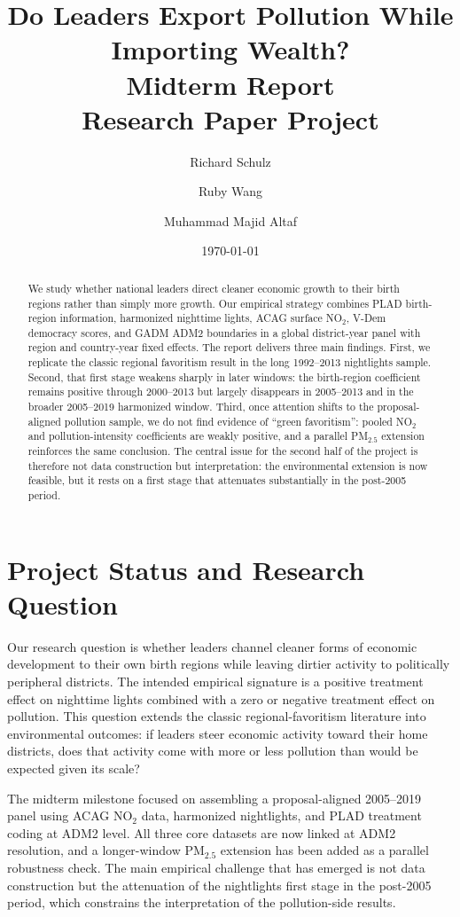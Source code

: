 \documentclass[11pt]{article}
\title{\textbf{Do Leaders Export Pollution While Importing Wealth?}\\[0.35em]
\large Midterm Report\\[0.2em]
\normalsize Research Paper Project}
\author{Richard Schulz \and Ruby Wang \and Muhammad Majid Altaf}
\date{\today}
\begin{document}
\maketitle
\thispagestyle{empty}

\begin{abstract}
We study whether national leaders direct cleaner economic growth to their birth regions rather than simply more growth. Our empirical strategy combines PLAD birth-region information, harmonized nighttime lights, ACAG surface NO$_2$, V-Dem democracy scores, and GADM ADM2 boundaries in a global district-year panel with region and country-year fixed effects. The report delivers three main findings. First, we replicate the classic regional favoritism result in the long 1992--2013 nightlights sample. Second, that first stage weakens sharply in later windows: the birth-region coefficient remains positive through 2000--2013 but largely disappears in 2005--2013 and in the broader 2005--2019 harmonized window. Third, once attention shifts to the proposal-aligned pollution sample, we do not find evidence of ``green favoritism'': pooled NO$_2$ and pollution-intensity coefficients are weakly positive, and a parallel PM$_{2.5}$ extension reinforces the same conclusion. The central issue for the second half of the project is therefore not data construction but interpretation: the environmental extension is now feasible, but it rests on a first stage that attenuates substantially in the post-2005 period.
\end{abstract}

\section{Project Status and Research Question}
Our research question is whether leaders channel cleaner forms of economic development to their own birth regions while leaving dirtier activity to politically peripheral districts. The intended empirical signature is a positive treatment effect on nighttime lights combined with a zero or negative treatment effect on pollution. This question extends the classic regional-favoritism literature into environmental outcomes: if leaders steer economic activity toward their home districts, does that activity come with more or less pollution than would be expected given its scale?

The midterm milestone focused on assembling a proposal-aligned 2005--2019 panel using ACAG NO$_2$ data, harmonized nightlights, and PLAD treatment coding at ADM2 level. All three core datasets are now linked at ADM2 resolution, and a longer-window PM$_{2.5}$ extension has been added as a parallel robustness check. The main empirical challenge that has emerged is not data construction but the attenuation of the nightlights first stage in the post-2005 period, which constrains the interpretation of the pollution-side results.
\end{document}

